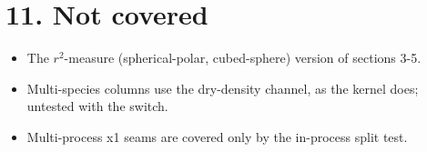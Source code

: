 \documentclass[11pt,a4paper]{article}
\begin{document}
\section*{11. Not covered}

\begin{itemize}
\item The $r^2$-measure (spherical-polar, cubed-sphere) version of sections 3-5.
\item Multi-species columns use the dry-density channel, as the kernel does; untested with the switch.
\item Multi-process x1 seams are covered only by the in-process split test.
\end{itemize}
\end{document}
